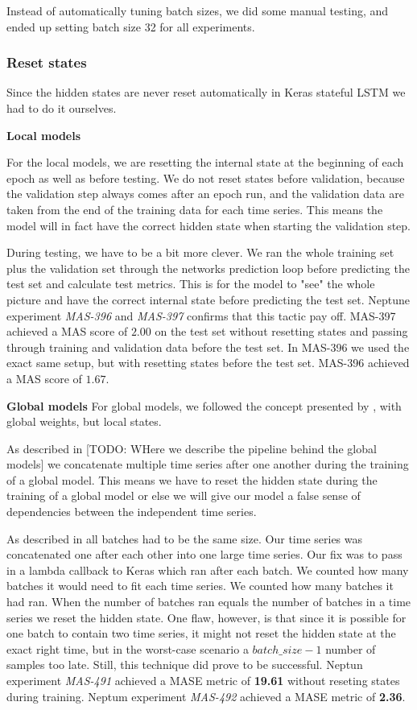 Instead of automatically tuning batch sizes, we did some manual testing, and
ended up setting batch size 32 for all experiments.


\subsubsection{Reset states}
Since  the hidden states are never reset automatically in Keras stateful LSTM
we had to do it ourselves.

\textbf{Local models}

For the local models, we are resetting the internal state at the beginning
of each epoch as well as before testing. We do not reset states before validation,
because the validation step always comes after an epoch run, and the
validation data are taken from the end of the training data for each time series.
This means the model will in fact have the correct hidden state when starting the validation step.

During testing, we have to be a bit more clever. We ran the whole training set plus
the validation set through the networks prediction loop before predicting the test
set and calculate test metrics.
This is for the model to "see" the whole picture and have the correct
internal state before predicting the test set.
Neptune experiment \textit{MAS-396} and \textit{MAS-397} confirms
that this tactic pay off. MAS-397 achieved a MAS score of $2.00$ on the test set
without resetting states and passing through training and validation data before
the test set. In MAS-396 we used the exact same setup, but with resetting states
before the test set. MAS-396 achieved a MAS score of $1.67$.

\textbf{Global models}
For global models, we followed the concept presented by \cite{Smyl2020},
with global weights, but local states.

As described in [TODO: WHere we describe the pipeline behind the global models]
we concatenate multiple time series after one another during the training of a global model.
This means we have to reset the hidden state during the training of a global model
or else we will give our model a false sense of dependencies between
the independent time series.

As described in  all
batches had to be the same size. Our time series was concatenated one after
each other into one large time series.
Our fix was to pass in a lambda callback to Keras which ran after each batch.
We counted how many batches it would need to fit each time series.
We counted how many batches it had ran. When the number of batches ran equals
the number of batches in a time series we reset the hidden state.
One flaw, however, is that since it is possible for one batch to
contain two time series, it might not reset the hidden state at the exact
right time, but in the worst-case scenario a $batch\_size - 1$ number of
samples too late. Still, this technique did prove to be successful.
Neptun experiment \textit{MAS-491} achieved a MASE metric of \textbf{19.61}
without reseting states during training.
Neptum experiment \textit{MAS-492} achieved a MASE metric of \textbf{2.36}.

